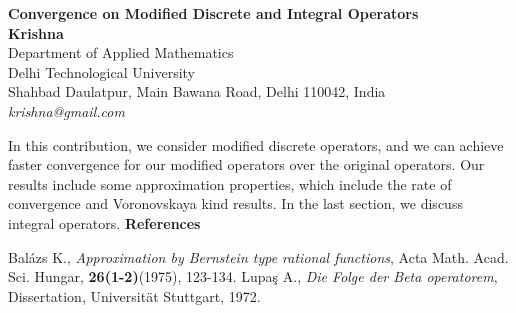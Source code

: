 \documentclass[12pt]{article}
\begin{document}
\vskip 1cm
\begin{center}
\textbf{\Large \sc Convergence on Modified Discrete and Integral Operators}\\
\textbf{Krishna}\\
Department of Applied Mathematics\\ Delhi Technological University\\
Shahbad Daulatpur, Main Bawana Road, Delhi 110042, India\\
\textit{krishna@gmail.com} %
\end{center}
\vskip 0.2cm
In this contribution, we consider modified discrete operators, and we can achieve faster convergence for our modified operators over the original operators. Our results include some approximation properties, which include the rate of convergence and Voronovskaya kind results. In the last section, we discuss integral operators.
\vskip 0.2cm
\medskip
\small
{\bf References}
\begin{enumerate}
Bal\'{a}zs K., \textit{Approximation by Bernstein type rational functions}, Acta Math. Acad. Sci. Hungar, \textbf{26(1-2)}(1975), 123-134.
Lupa\c{s} A., \textit{Die Folge der Beta operatorem}, Dissertation, Universit\"{a}t Stuttgart, 1972.
\end{enumerate}
\end{document}
